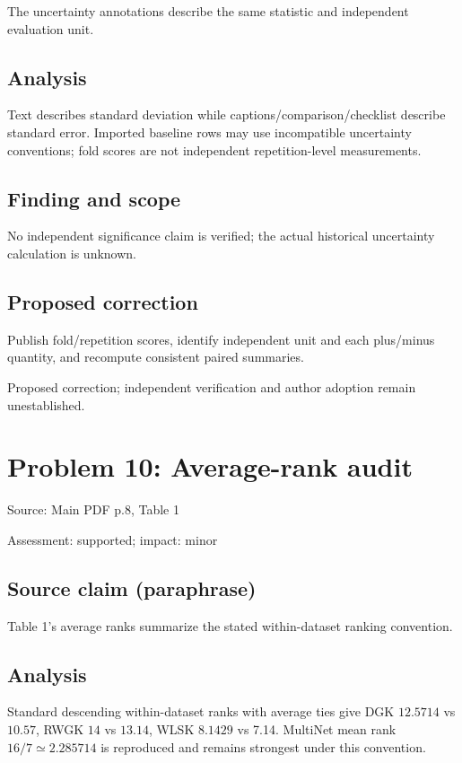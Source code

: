\documentclass[11pt]{article}
\begin{document}
The uncertainty annotations describe the same statistic and independent evaluation unit.

\subsection*{Analysis}

Text describes standard deviation while captions/comparison/checklist describe standard error. Imported baseline rows may use incompatible uncertainty conventions; fold scores are not independent repetition-level measurements.

\subsection*{Finding and scope}

No independent significance claim is verified; the actual historical uncertainty calculation is unknown.

\subsection*{Proposed correction}

Publish fold/repetition scores, identify independent unit and each plus/minus quantity, and recompute consistent paired summaries.

Proposed correction; independent verification and author adoption remain unestablished.

\section*{Problem 10: Average-rank audit}

Source: Main PDF p.8, Table 1

Assessment: supported; impact: minor

\subsection*{Source claim (paraphrase)}

Table 1's average ranks summarize the stated within-dataset ranking convention.

\subsection*{Analysis}

Standard descending within-dataset ranks with average ties give DGK \(12.5714\) vs \(10.57\), RWGK \(14\) vs \(13.14\), WLSK \(8.1429\) vs 7.14. MultiNet mean rank \(16/7\simeq2.285714\) is reproduced and remains strongest under this convention.
\end{document}
